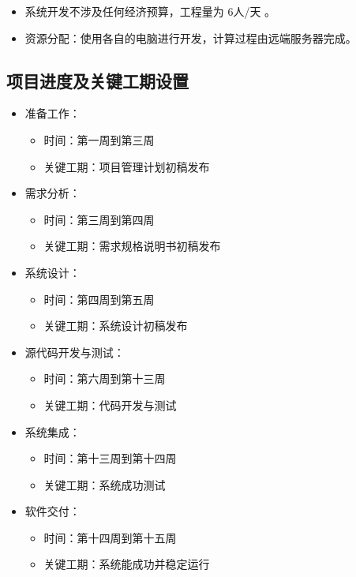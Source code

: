 \documentclass[hyperref, a4paper]{ctexart}
\providecommand{\tightlist}{%
  \setlength{\itemsep}{0pt}\setlength{\parskip}{0pt}}
\begin{document}
\begin{itemize}
\tightlist
\item
  系统开发不涉及任何经济预算，工程量为 6人/天 。
\item
  资源分配：使用各自的电脑进行开发，计算过程由远端服务器完成。
\end{itemize}

\hypertarget{ux9879ux76eeux8fdbux5ea6ux53caux5173ux952eux5de5ux671fux8bbeux7f6e-1}{%
\subsection{项目进度及关键工期设置}\label{ux9879ux76eeux8fdbux5ea6ux53caux5173ux952eux5de5ux671fux8bbeux7f6e-1}}

\begin{itemize}
\tightlist
\item
  准备工作：

  \begin{itemize}
  \tightlist
  \item
    时间：第一周到第三周
  \item
    关键工期：项目管理计划初稿发布
  \end{itemize}
\item
  需求分析：

  \begin{itemize}
  \tightlist
  \item
    时间：第三周到第四周
  \item
    关键工期：需求规格说明书初稿发布
  \end{itemize}
\item
  系统设计：

  \begin{itemize}
  \tightlist
  \item
    时间：第四周到第五周
  \item
    关键工期：系统设计初稿发布
  \end{itemize}
\item
  源代码开发与测试：

  \begin{itemize}
  \tightlist
  \item
    时间：第六周到第十三周
  \item
    关键工期：代码开发与测试
  \end{itemize}
\item
  系统集成：

  \begin{itemize}
  \tightlist
  \item
    时间：第十三周到第十四周
  \item
    关键工期：系统成功测试
  \end{itemize}
\item
  软件交付：

  \begin{itemize}
  \tightlist
  \item
    时间：第十四周到第十五周
  \item
    关键工期：系统能成功并稳定运行
  \end{itemize}
\end{itemize}
\end{document}
